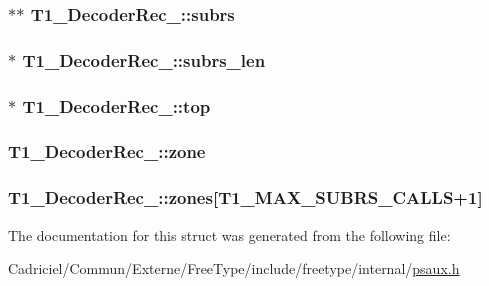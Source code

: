 \hypertarget{struct_t1___decoder_rec___a069e863647a7f3ff1f9fa36d4ff20bec}{
\subsubsection[{subrs}]{$\ast$$\ast$ T1\-\_\-\-Decoder\-Rec\-\_\-\-::subrs}}\label{struct_t1___decoder_rec___a069e863647a7f3ff1f9fa36d4ff20bec}
\hypertarget{struct_t1___decoder_rec___ab6c66c44ec67740cf88be663cfa0c0cc}{
\subsubsection[{subrs\-\_\-len}]{$\ast$ T1\-\_\-\-Decoder\-Rec\-\_\-\-::subrs\-\_\-len}}\label{struct_t1___decoder_rec___ab6c66c44ec67740cf88be663cfa0c0cc}
\hypertarget{struct_t1___decoder_rec___a5f26aa85b1859f23427b7aba9008f126}{
\subsubsection[{top}]{$\ast$ T1\-\_\-\-Decoder\-Rec\-\_\-\-::top}}\label{struct_t1___decoder_rec___a5f26aa85b1859f23427b7aba9008f126}
\hypertarget{struct_t1___decoder_rec___add29399f0c811404b9d6ca373793103e}{
\subsubsection[{zone}]{ T1\-\_\-\-Decoder\-Rec\-\_\-\-::zone}}\label{struct_t1___decoder_rec___add29399f0c811404b9d6ca373793103e}
\hypertarget{struct_t1___decoder_rec___a4e33201df5beec8a3d81eca726b09ea5}{
\subsubsection[{zones}]{ T1\-\_\-\-Decoder\-Rec\-\_\-\-::zones\mbox{[}{\bf T1\-\_\-\-M\-A\-X\-\_\-\-S\-U\-B\-R\-S\-\_\-\-C\-A\-L\-L\-S}+1\mbox{]}}}\label{struct_t1___decoder_rec___a4e33201df5beec8a3d81eca726b09ea5}


The documentation for this struct was generated from the following file\-:\begin{DoxyCompactItemize}
\item 
Cadriciel/\-Commun/\-Externe/\-Free\-Type/include/freetype/internal/\hyperlink{psaux_8h}{psaux.\-h}\end{DoxyCompactItemize}
